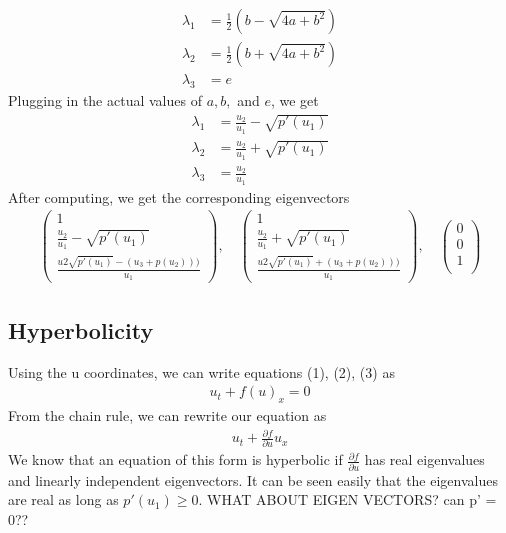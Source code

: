 \begin{align*}
	\lambda_1 &= \frac{1}{2} (b - \sqrt{4a+b^2}) \\
	\lambda_2 &= \frac{1}{2} (b + \sqrt{4a+b^2}) \\
	\lambda_3 &= e
\end{align*}
Plugging in the actual values of $a,b,$ and $e$, we get 
\begin{align*}
	\lambda_1 &= \frac{u_2}{u_1} - \sqrt{p'(u_1)} \\
	\lambda_2 &= \frac{u_2}{u_1} + \sqrt{p'(u_1)} \\
	\lambda_3 &= \frac{u_2}{u_1}
\end{align*}
After computing, we get the corresponding eigenvectors 
\begin{align*}
\begin{pmatrix}
1 \\
 \frac{u_2}{u_1} - \sqrt{p'(u_1 )} \\
 \frac{u2 \sqrt{p'(u_1)}-(u_3+p(u_2)))}{u_1} 
\end{pmatrix}, \quad \begin{pmatrix}
1 \\
 \frac{u_2}{u_1} + \sqrt{p'(u_1 )} \\
 \frac{u2 \sqrt{p'(u_1)}+(u_3+p(u_2)))}{u_1} 
\end{pmatrix}, \quad \begin{pmatrix}
 0 \\
 0  \\
 1 \\
\end{pmatrix}
\end{align*}
\subsection{Hyperbolicity}
Using the u coordinates, we can write equations (1), (2), (3) as
\begin{align*}
	u_t + f(u)_x = 0
\end{align*}
From the chain rule, we can rewrite our equation as  
\begin{align*}
	u_t + \frac{\partial f}{\partial u} u_x
\end{align*}
We know that an equation of this form is hyperbolic if $\frac{\partial f}{\partial u}$ has real eigenvalues and linearly independent eigenvectors. It can be seen easily that the eigenvalues are real as long as $p'(u_1) \geq 0$. WHAT ABOUT EIGEN VECTORS? can p' = 0??